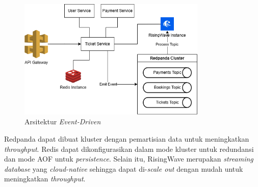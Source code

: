 \begin{figure}[ht]
    \centering
    \includegraphics[width=0.8\textwidth]{resources/chapter-3/architecture-event-driven.png}
    \caption{Arsitektur \textit{Event-Driven}}
    \label{fig:solution-event-driven-architecture}
\end{figure}

Redpanda dapat dibuat kluster dengan pemartisian data untuk meningkatkan \textit{throughput}. Redis dapat dikonfigurasikan dalam mode kluster untuk redundansi dan mode AOF untuk \textit{persistence}. Selain itu, RisingWave merupakan \textit{streaming database} yang \textit{cloud-native} sehingga dapat di-\textit{scale out} dengan mudah untuk meningkatkan \textit{throughput}.


